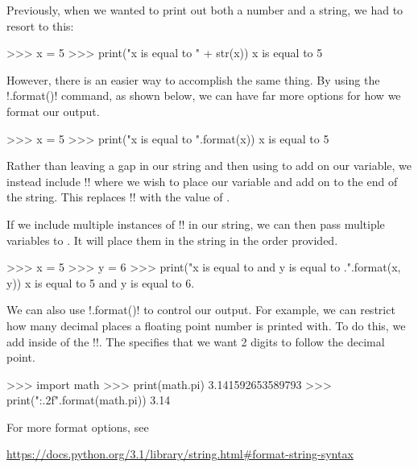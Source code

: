 \documentclass[11pt]{cselabheader}
\begin{document}
Previously, when we wanted to print out both a number and a string, we
had to resort to this:

\begin{pyconcode}
>>> x = 5
>>> print("x is equal to " + str(x))
x is equal to 5
\end{pyconcode}

However, there is an easier way to accomplish the same thing. By using the
\pythoninline!.format()! command, as shown below, we can have far more options for
how we format our output.

\begin{pyconcode}
>>> x = 5
>>> print("x is equal to {}".format(x))
x is equal to 5
\end{pyconcode}

Rather than leaving a gap in our string and then using \pythoninline{+} to add on
our variable, we instead include \pythoninline!{}! where we wish to place our
variable and add on  to the end of the string. This
replaces \pythoninline!{}! with the value of .

If we include multiple instances of \pythoninline!{}! in our string, we can then
pass multiple variables to . It will place them in the
string in the order provided.

\begin{pyconcode}
>>> x = 5
>>> y = 6
>>> print("x is equal to {} and y is equal to {}.".format(x, y))
x is equal to 5 and y is equal to 6.
\end{pyconcode}

We can also use \pythoninline!.format()! to control our output. For example, we can
restrict how many decimal places a floating point number is printed with. To do
this, we add  inside of the \pythoninline!{}!. The 
specifies that we want 2 digits to follow the decimal point. 

\begin{pyconcode}
>>> import math
>>> print(math.pi)
3.141592653589793
>>> print("{:.2f}".format(math.pi))
3.14
\end{pyconcode}

For more format options, see
\begin{center}
  \vspace{-2mm}
\url{https://docs.python.org/3.1/library/string.html#format-string-syntax}
\vspace{-2mm}

\end{center}
\end{document}
